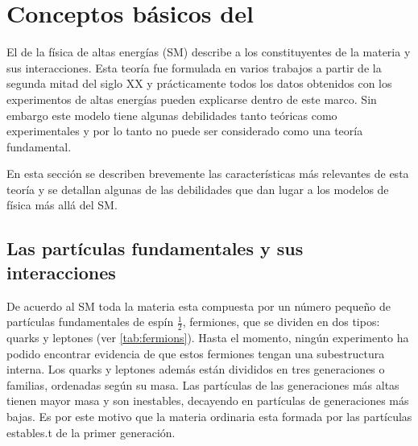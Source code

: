 \section{Conceptos básicos del \SM}
\label{cap:sm}

El {\SM} de la física de altas energías (SM) describe a los
constituyentes de la materia y sus interacciones. Esta teoría fue formulada en
varios trabajos a partir de la segunda mitad del siglo XX y prácticamente todos
los datos obtenidos con los experimentos de altas energías pueden explicarse
dentro de este marco. Sin embargo este modelo tiene algunas debilidades tanto
teóricas como experimentales y por lo tanto no puede ser considerado como una
teoría fundamental.

En esta sección se describen brevemente las características más relevantes de
esta teoría y se detallan algunas de las debilidades que dan lugar a
los modelos de física más allá del SM.


\subsection{Las partículas fundamentales y sus interacciones}

De acuerdo al SM toda la materia esta compuesta por un número peque\~no de
partículas fundamentales de espín $\frac{1}{2}$, fermiones, que se
dividen en dos tipos: quarks y leptones (ver \cref{tab:fermions}). Hasta el
momento, ningún experimento ha podido encontrar evidencia de que estos fermiones
tengan una subestructura interna. Los quarks y leptones además están divididos
en tres generaciones o familias, ordenadas según su masa. Las partículas
de las generaciones más altas tienen mayor masa y son inestables, decayendo
en partículas de generaciones más bajas. Es por este motivo que la materia
ordinaria esta formada por las partículas estables.t de la primer generación.

